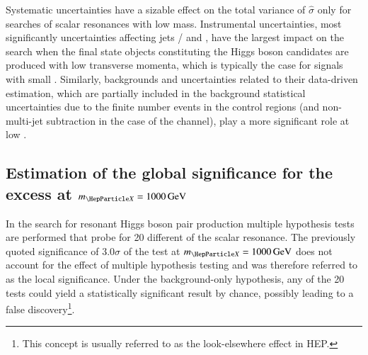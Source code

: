 Systematic uncertainties have a sizable effect on the total variance
of $\hat{\sigma}$ only for searches of scalar resonances with low
mass. Instrumental uncertainties, most significantly uncertainties
affecting jets / \pTmissAbs and \tauhadvis, have the largest impact on
the search when the final state objects constituting the Higgs boson
candidates are produced with low transverse momenta, which is
typically the case for signals with small \mX. Similarly,
\faketauhadvis backgrounds and uncertainties related to their
data-driven estimation, which are partially included in the background
statistical uncertainties due to the finite number events in the
control regions (and non-multi-jet subtraction in the case of the
\hadhad channel), play a more significant role at low \mX.




\subsection{Estimation of the global significance for the excess at
  $\mX = \SI{1000}{\GeV}$}%
\label{sec:global_significance}

In the search for resonant Higgs boson pair production multiple
hypothesis tests are performed that probe for 20 different \mX of the
scalar resonance. The previously quoted significance of $3.0\sigma$ of
the test at $\mX = \SI{1000}{\GeV}$ does not account for the effect of
multiple hypothesis testing and was therefore referred to as the local
significance. Under the background-only hypothesis, any of the 20
tests could yield a statistically significant result by chance,
possibly leading to a false discovery\footnote{This concept is usually
  referred to as the look-elsewhere effect in HEP.}.

